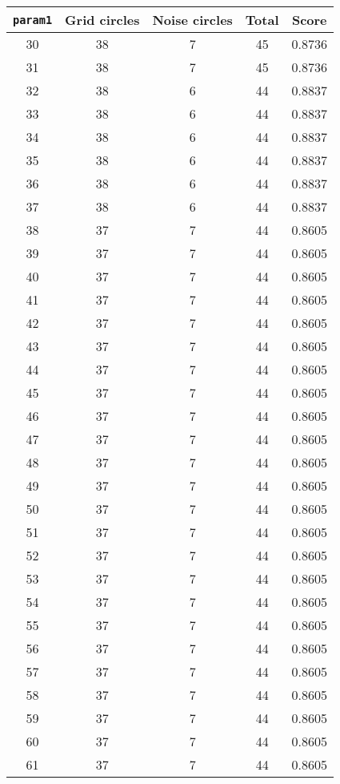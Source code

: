 \documentclass[letterpaper, 12pt]{article}
\begin{document}
\begin{longtable}{|c|c|c|c|c|}
\hline
\textbf{\texttt{param1}} & \textbf{Grid circles} & \textbf{Noise circles} & \textbf{Total} & \textbf{Score} \\
\hline
30 & 38 & 7 & 45 & 0.8736 \\
\hline
31 & 38 & 7 & 45 & 0.8736 \\
\hline
32 & 38 & 6 & 44 & 0.8837 \\
\hline
33 & 38 & 6 & 44 & 0.8837 \\
\hline
34 & 38 & 6 & 44 & 0.8837 \\
\hline
35 & 38 & 6 & 44 & 0.8837 \\
\hline
36 & 38 & 6 & 44 & 0.8837 \\
\hline
37 & 38 & 6 & 44 & 0.8837 \\
\hline
38 & 37 & 7 & 44 & 0.8605 \\
\hline
39 & 37 & 7 & 44 & 0.8605 \\
\hline
40 & 37 & 7 & 44 & 0.8605 \\
\hline
41 & 37 & 7 & 44 & 0.8605 \\
\hline
42 & 37 & 7 & 44 & 0.8605 \\
\hline
43 & 37 & 7 & 44 & 0.8605 \\
\hline
44 & 37 & 7 & 44 & 0.8605 \\
\hline
45 & 37 & 7 & 44 & 0.8605 \\
\hline
46 & 37 & 7 & 44 & 0.8605 \\
\hline
47 & 37 & 7 & 44 & 0.8605 \\
\hline
48 & 37 & 7 & 44 & 0.8605 \\
\hline
49 & 37 & 7 & 44 & 0.8605 \\
\hline
50 & 37 & 7 & 44 & 0.8605 \\
\hline
51 & 37 & 7 & 44 & 0.8605 \\
\hline
52 & 37 & 7 & 44 & 0.8605 \\
\hline
53 & 37 & 7 & 44 & 0.8605 \\
\hline
54 & 37 & 7 & 44 & 0.8605 \\
\hline
55 & 37 & 7 & 44 & 0.8605 \\
\hline
56 & 37 & 7 & 44 & 0.8605 \\
\hline
57 & 37 & 7 & 44 & 0.8605 \\
\hline
58 & 37 & 7 & 44 & 0.8605 \\
\hline
59 & 37 & 7 & 44 & 0.8605 \\
\hline
60 & 37 & 7 & 44 & 0.8605 \\
\hline
61 & 37 & 7 & 44 & 0.8605 \\

\end{longtable}
\end{document}
